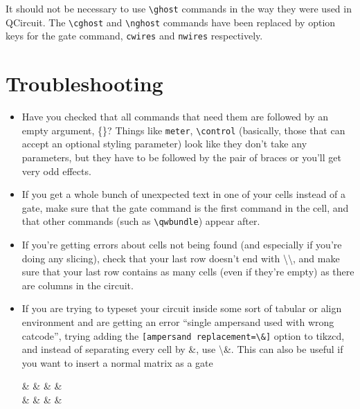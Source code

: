 \documentclass[aps,pra,10pt,nofootinbib]{revtex4}
\begin{document}
It should not be necessary to use \verb!\ghost! commands in the way they were used in QCircuit. The \verb!\cghost! and \verb!\nghost! commands have been replaced by option keys for the gate command, \verb!cwires! and \verb!nwires! respectively.

\section{Troubleshooting}\label{sec:trouble}
\begin{itemize}
\item Have you checked that all commands that need them are followed by an empty argument, \{\}? Things like \verb!meter!, \verb!\control! (basically, those that can accept an optional styling parameter) look like they don't take any parameters, but they have to be followed by the pair of braces or you'll get very odd effects.
\item If you get a whole bunch of unexpected text in one of your cells instead of a gate, make sure that the gate command is the first command in the cell, and that other commands (such as \verb!\qwbundle!) appear after.
\item If you're getting errors about cells not being found (and especially if you're doing any slicing), check that your last row doesn't end with \textbackslash\textbackslash, and make sure that your last row contains as many cells (even if they're empty) as there are columns in the circuit.
\item If you are trying to typeset your circuit inside some sort of tabular or align environment and are getting an error ``single ampersand used with wrong catcode'', trying adding the \verb![ampersand replacement=\&]! option to tikzcd, and instead of separating every cell by \&, use \textbackslash\&. This can also be useful if you want to insert a normal matrix as a gate
\begin{Code}
\begin{center}
\begin{quantikz}[ampersand replacement=\&]
 \&  \&  \&  \& \qw \\
 \& \qw \& \targ{} \&  \& \qw
\end{quantikz}
\end{center}
\tcblower
\begin{lstlisting}

\end{lstlisting}
\end{Code}
\end{itemize}
\end{document}
